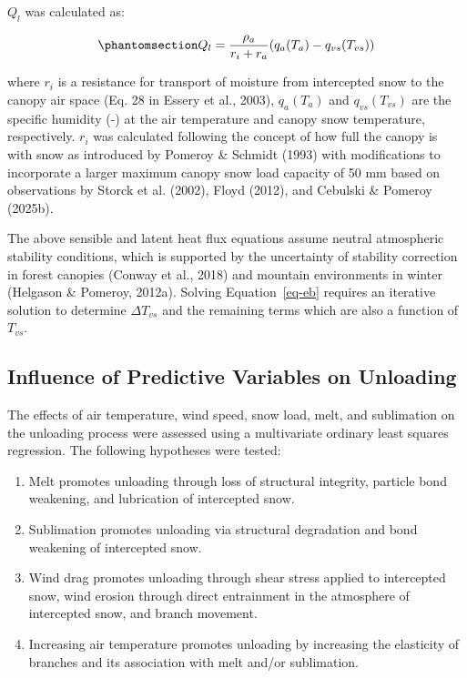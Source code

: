 \documentclass[
]{agujournal2019}
\providecommand{\tightlist}{%
  \setlength{\itemsep}{0pt}\setlength{\parskip}{0pt}}
\begin{document}
\(Q_l\) was calculated as:

\begin{equation}\phantomsection\label{eq-ql}{
Q_l = \frac{\rho_a}{r_i+r_a} (q_a(T_a) - q_{vs}(T_{vs}))
}\end{equation}

where \(r_i\) is a resistance for transport of moisture from intercepted
snow to the canopy air space (Eq. 28 in Essery et al., 2003),
\(q_a(T_a)\) and \(q_{vs}(T_{vs})\) are the specific humidity (-) at the
air temperature and canopy snow temperature, respectively. \(r_i\) was
calculated following the concept of how full the canopy is with snow as
introduced by Pomeroy \& Schmidt (1993) with modifications to
incorporate a larger maximum canopy snow load capacity of 50 mm based on
observations by Storck et al. (2002), Floyd (2012), and Cebulski \&
Pomeroy (2025b).

The above sensible and latent heat flux equations assume neutral
atmospheric stability conditions, which is supported by the uncertainty
of stability correction in forest canopies (Conway et al., 2018) and
mountain environments in winter (Helgason \& Pomeroy, 2012a). Solving
Equation~\ref{eq-eb} requires an iterative solution to determine
\(\Delta T_{vs}\) and the remaining terms which are also a function of
\(T_{vs}\).

\subsection{Influence of Predictive Variables on
Unloading}\label{influence-of-predictive-variables-on-unloading}

The effects of air temperature, wind speed, snow load, melt, and
sublimation on the unloading process were assessed using a multivariate
ordinary least squares regression. The following hypotheses were tested:

\begin{enumerate}
\def\labelenumi{\alph{enumi}.}
\tightlist
\item
  Melt promotes unloading through loss of structural integrity, particle
  bond weakening, and lubrication of intercepted snow.
\item
  Sublimation promotes unloading via structural degradation and bond
  weakening of intercepted snow.
\item
  Wind drag promotes unloading through shear stress applied to
  intercepted snow, wind erosion through direct entrainment in the
  atmosphere of intercepted snow, and branch movement.
\item
  Increasing air temperature promotes unloading by increasing the
  elasticity of branches and its association with melt and/or
  sublimation.
\end{enumerate}
\end{document}

